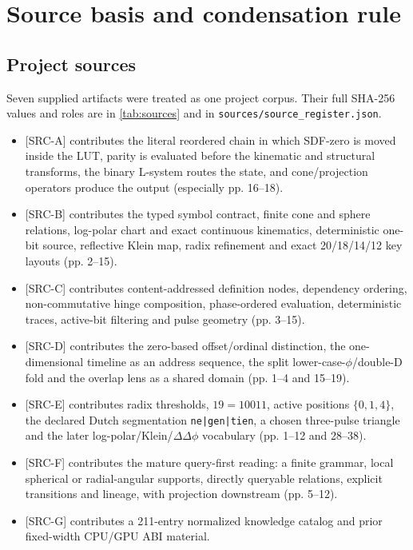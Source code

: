 \documentclass[11pt,a4paper]{article}
\newcommand{\source}[1]{\textsf{[SRC-#1]}}
\newcommand{\code}[1]{\texttt{#1}}
\begin{document}
\section{Source basis and condensation rule}

\subsection{Project sources}
Seven supplied artifacts were treated as one project corpus. Their full SHA-256 values and roles are in \cref{tab:sources} and in \code{sources/source\_register.json}.

\begin{itemize}
\item \source{A} contributes the literal reordered chain in which SDF-zero is moved inside the LUT, parity is evaluated before the kinematic and structural transforms, the binary L-system routes the state, and cone/projection operators produce the output (especially pp. 16--18).
\item \source{B} contributes the typed symbol contract, finite cone and sphere relations, log-polar chart and exact continuous kinematics, deterministic one-bit source, reflective Klein map, radix refinement and exact 20/18/14/12 key layouts (pp. 2--15).
\item \source{C} contributes content-addressed definition nodes, dependency ordering, non-commutative hinge composition, phase-ordered evaluation, deterministic traces, active-bit filtering and pulse geometry (pp. 3--15).
\item \source{D} contributes the zero-based offset/ordinal distinction, the one-dimensional timeline as an address sequence, the split lower-case-$\phi$/double-D fold and the overlap lens as a shared domain (pp. 1--4 and 15--19).
\item \source{E} contributes radix thresholds, $19=10011$, active positions $\{0,1,4\}$, the declared Dutch segmentation \code{ne|gen|tien}, a chosen three-pulse triangle and the later log-polar/Klein/$\Delta\Delta\phi$ vocabulary (pp. 1--12 and 28--38).
\item \source{F} contributes the mature query-first reading: a finite grammar, local spherical or radial-angular supports, directly queryable relations, explicit transitions and lineage, with projection downstream (pp. 5--12).
\item \source{G} contributes a 211-entry normalized knowledge catalog and prior fixed-width CPU/GPU ABI material.
\end{itemize}
\end{document}
